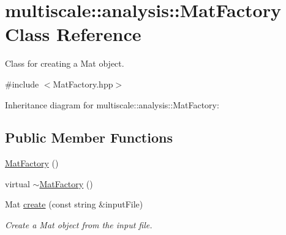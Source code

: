 \hypertarget{classmultiscale_1_1analysis_1_1MatFactory}{\section{multiscale\-:\-:analysis\-:\-:Mat\-Factory Class Reference}
\label{classmultiscale_1_1analysis_1_1MatFactory}
}


Class for creating a Mat object.  




{\ttfamily \#include $<$Mat\-Factory.\-hpp$>$}



Inheritance diagram for multiscale\-:\-:analysis\-:\-:Mat\-Factory\-:
\subsection*{Public Member Functions}
\begin{DoxyCompactItemize}
\item 
\hyperlink{classmultiscale_1_1analysis_1_1MatFactory_a454ca2abfbeb664e75f5365ac00eacff}{Mat\-Factory} ()
\item 
virtual \hyperlink{classmultiscale_1_1analysis_1_1MatFactory_aa339532cb504caebcf9ece2c847f4847}{$\sim$\-Mat\-Factory} ()
\item 
Mat \hyperlink{classmultiscale_1_1analysis_1_1MatFactory_a7800a989d808037fe96a9d5a692909b0}{create} (const string \&input\-File)
\begin{DoxyCompactList}\small\item\em Create a Mat object from the input file. \end{DoxyCompactList}\end{DoxyCompactItemize}
